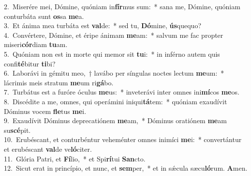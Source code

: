 {2.~}Miserére mei, Dómine, quóniam in\textbf{fír}mus sum:~* sana me, Dómine, quóniam conturbáta sunt \textbf{os}sa \textbf{me}a.\\
{3.~}Et ánima mea turbáta est \textbf{val}de:~* sed tu, \textbf{Dó}mine, \textbf{ús}quequo?\\
{4.~}Convértere, Dómine, et éripe ánimam \textbf{me}am:~* salvum me fac propter miseri\textbf{cór}diam \textbf{tu}am.\\
{5.~}Quóniam non est in morte qui memor sit \textbf{tu}i:~* in inférno autem quis confi\textbf{té}bitur \textbf{ti}bi?\\
{6.~}Laborávi in gémitu meo,~† lavábo per síngulas noctes lectum \textbf{me}um:~* lácrimis meis stratum \textbf{me}um ri\textbf{gá}bo.\\
{7.~}Turbátus est a furóre óculus \textbf{me}us:~* inveterávi inter omnes ini\textbf{mí}cos \textbf{me}os.\\
{8.~}Discédite a me, omnes, qui operámini iniqui\textbf{tá}tem:~* quóniam exaudívit Dóminus vocem \textbf{fle}tus \textbf{me}i.\\
{9.~}Exaudívit Dóminus deprecatiónem \textbf{me}am,~* Dóminus oratiónem \textbf{me}am su\textbf{scé}pit.\\
{10.~}Erubéscant, et conturbéntur veheménter omnes inimíci \textbf{me}i:~* convertántur et erubéscant \textbf{val}de ve\textbf{ló}citer.\\
{11.~}Glória Patri, et \textbf{Fí}lio,~* et Spi\textbf{rí}tui \textbf{San}cto.\\
{12.~}Sicut erat in princípio, et nunc, et \textbf{sem}per,~* et in sǽcula sæcu\textbf{ló}rum. \textbf{A}men.\\
